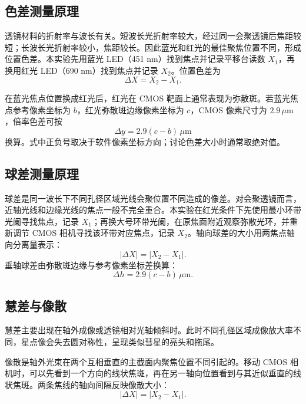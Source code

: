 \documentclass[12pt,a4paper]{article}
\begin{document}
\subsection{色差测量原理}

透镜材料的折射率与波长有关。短波长光折射率较大，经过同一会聚透镜后焦距较短；长波长光折射率较小，焦距较长。因此蓝光和红光的最佳聚焦位置不同，形成位置色差。本实验先用蓝光 LED（451 nm）找到焦点并记录平移台读数 $X_1$，再换用红光 LED（690 nm）找到焦点并记录 $X_2$。位置色差为
\begin{equation}
  \Delta X = X_2-X_1 .
\end{equation}

在蓝光焦点位置换成红光后，红光在 CMOS 靶面上通常表现为弥散斑。若蓝光焦点参考像素坐标为 $b$，红光弥散斑边缘像素坐标为 $c$，CMOS 像素尺寸为 $2.9\,\mu\mathrm{m}$，倍率色差可按
\begin{equation}
  \Delta y = 2.9(c-b)\,\mu\mathrm{m}
\end{equation}
换算。式中正负号取决于软件像素坐标方向；讨论色差大小时通常取绝对值。

\subsection{球差测量原理}

球差是同一波长下不同孔径区域光线会聚位置不同造成的像差。对会聚透镜而言，近轴光线和边缘光线的焦点一般不完全重合。本实验在红光条件下先使用最小环带光阑寻找焦点，记录 $X_1$；再换大号环带光阑，在原焦面附近观察弥散光环，并重新调节 CMOS 相机寻找该环带对应焦点，记录 $X_2$。轴向球差的大小用两焦点轴向分离量表示：
\begin{equation}
  \left|\Delta X\right|=\left|X_2-X_1\right|.
\end{equation}
垂轴球差由弥散斑边缘与参考像素坐标差换算：
\begin{equation}
  \Delta h = 2.9(c-b)\,\mu\mathrm{m}.
\end{equation}

\subsection{慧差与像散}

慧差主要出现在轴外成像或透镜相对光轴倾斜时。此时不同孔径区域成像放大率不同，星点像会失去圆对称性，呈现类似彗星的亮头和拖尾。

像散是轴外光束在两个互相垂直的主截面内聚焦位置不同引起的。移动 CMOS 相机时，可以先看到一个方向的线状焦斑，再在另一轴向位置看到与其近似垂直的线状焦斑。两条焦线的轴向间隔反映像散大小：
\begin{equation}
  \left|\Delta X\right|=\left|X_2-X_1\right|.
\end{equation}
\end{document}
